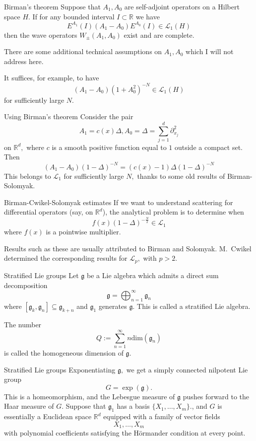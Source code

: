 \documentclass{beamer}
\numberwithin{equation}{section}
\theoremstyle{plain}
\theoremstyle{plain}
\theoremstyle{definition}
\theoremstyle{plain}
\theoremstyle{plain}
\theoremstyle{definition}
\newcommand{\Rl}{\mathbb{R}}
\newcommand{\Lc}{\mathcal{L}}
\newcommand{\gf}{\mathfrak{g}}
\begin{document}
\begin{frame}{Birman's theorem}
  Suppose that $A_1,A_0$ are self-adjoint operators on a Hilbert space $H.$ If for any bounded interval $I\subset \Rl$ we have
  \[
    E^{A_1}(I)(A_1-A_0)E^{A_0}(I) \in \Lc_1(H)
  \]
  then the wave operators $W_{\pm}(A_1,A_0)$ exist and are complete.\\\pause

  {\color{red} There are some additional technical assumptions on $A_1,A_0$ which I will not address here.}\\ \pause

  It suffices, for example, to have
  \[
    (A_1-A_0)(1+A_0^2)^{-N} \in \Lc_1(H)
  \]
  for sufficiently large $N.$
\end{frame}

\begin{frame}{Using Birman's theorem}
  Consider the pair
  \[
      A_1 =c(x)\Delta, A_0 = \Delta = \sum_{j=1}^d \partial_{x_j}^2
  \]
  on $\Rl^d,$ where $c$ is a smooth positive function equal to $1$ outside a compact set. Then
  \[
    (A_1-A_0)(1-\Delta)^{-N} =(c(x)-1)\Delta (1-\Delta)^{-N}
  \]
  This belongs to $\Lc_1$ for sufficiently large $N,$ thanks to some old results of Birman-Solomyak.
\end{frame}

\begin{frame}{Birman-Cwikel-Solomyak estimates}
  If we want to understand scattering for differential operators (say, on $\Rl^d$), the analytical problem is to determine when
  \[
    f(x)(1-\Delta)^{-\frac{N}{2}} \in \Lc_1
  \]
  where $f(x)$ is a pointwise multiplier.

  Results such as these are usually attributed to Birman and Solomyak. M.~Cwikel determined the corresponding results for $\Lc_p,$ with $p>2.$
\end{frame}


\begin{frame}{Stratified Lie groups}
  Let $\gf$ be a Lie algebra which admits a direct sum decomposition
  \[
    \gf = \bigoplus_{n=1}^\infty \gf_n
  \]
  where $[\gf_k,\gf_n] \subseteq \gf_{k+n}$ and $\gf_1$ generates $\gf.$
  This is called a stratified Lie algebra.

  The number
  \[
    Q := \sum_{n=1}^\infty n\mathrm{dim}(\gf_n)
  \]
  is called the homogeneous dimension of $\gf.$
\end{frame}

\begin{frame}{Stratified Lie groups}
  Exponentiating $\gf,$ we get a simply connected nilpotent Lie group
  \[
    G = \exp(\gf).
  \]
  This is a homeomorphism, and the Lebesgue measure of $\gf$ pushes forward to the Haar measure of $G.$
  Suppose that $\gf_1$ has a basis $\{X_1,\ldots,X_m\}.$, and $G$ is essentially a Euclidean space $\Rl^d$ equipped with a family of vector fields
  \[
    X_1,\ldots,X_m
  \]
  with polynomial coefficients satisfying the H\"ormander condition at every point.
\end{frame}
\end{document}

